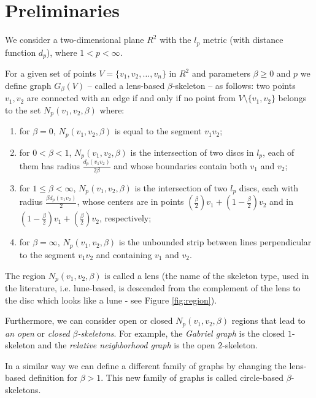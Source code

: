 \documentclass[11pt]{llncs}
\begin{document}
\section{Preliminaries}

We consider a two-dimensional plane $R^2$ with the $l_p$ metric (with distance 
function $d_p$), where $1<p<\infty$. 

\begin{definition} \cite{kr85}
\label{betaskeleton}
For a given set of points  $V=\{v_1, v_2, \dots , v_n\}$ in $R^2$ and parameters 
$\beta \geq 0$ and $p$ we define graph 
$G_{\beta}(V)$ -- called a lens-based $\beta$-skeleton -- as follows:  
two points $v_1, v_2$ are connected with an edge if and only if no point 
from $V \setminus \{v_1, v_2\}$ belongs to the set 
$N_{p}(v_1, v_2,\beta)$ where:

\begin{enumerate} 
\item 
for $\beta=0$,  $N_{p}(v_1, v_2,\beta)$ is equal to the segment $v_1v_2$;
\item 
for $0<\beta<1$, $N_{p}(v_1, v_2,\beta)$ is the intersection of two discs in $l_p$, 
each of them has
radius $\frac{d_p(v_1v_2)}{2\beta}$ and whose boundaries contain both $v_1$ and $v_2$;
\item 
for $1 \leq \beta<\infty$, $N_{p}(v_1,v_2,\beta)$ is the intersection of two $l_p$ 
discs, each with radius $\frac{\beta d_p(v_1v_2)}{2}$, whose centers are in points 
$(\frac{\beta}{2})v_1+(1-\frac{\beta}{2})v_2$ and 
in $(1-\frac{\beta}{2})v_1+(\frac{\beta}{2})v_2$, respectively;
\item 
for $\beta=\infty$, $N_{p}(v_1,v_2,\beta)$ is the unbounded strip between lines 
perpendicular to the segment $v_1v_2$ and containing $v_1$ and $v_2$.
\end{enumerate}

The region $N_{p}(v_1, v_2,\beta)$ is called a lens (the name of the skeleton type, used 
in the literature, i.e. lune-based, is descended from the complement of the lens to the disc 
which looks like a lune - see Figure \ref{fig:region}). 
\end{definition}

Furthermore,  we can  consider  open or closed $N_{p}(v_1,v_2,\beta)$ regions
that lead to {\em an open} or {\em closed $\beta$-skeletons}. For example,  the
{\em Gabriel graph} is the closed $1$-skeleton and the
{\em relative neighborhood graph} is the open $2$-skeleton.

In a similar way we can define a different family of graphs by changing 
the lens-based definition for $\beta > 1$. This new family of graphs is called 
circle-based $\beta$-skeletons. \\ 
\end{document}
